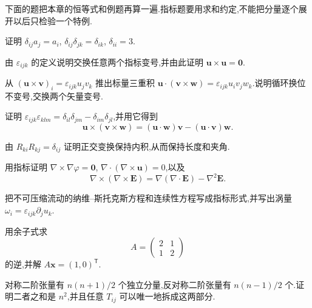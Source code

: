 下面的题把本章的恒等式和例题再算一遍.指标题要用求和约定,不能把分量逐个展开以后只检验一个特例.

\begin{problemset}
\renewcommand{\theenumi}{\thechapter.\arabic{enumi}}
\renewcommand{\labelenumi}{\theenumi.}
\item 证明 $\delta_{ij}a_j=a_i$, $\delta_{ij}\delta_{jk}=\delta_{ik}$, $\delta_{ii}=3$.

\item 由 $\varepsilon_{ijk}$ 的定义说明交换任意两个指标变号,并由此证明 $\mathbf{u}\times\mathbf{u}=\mathbf{0}$.

\item 从 $(\mathbf{u}\times\mathbf{v})_i=\varepsilon_{ijk}u_j v_k$ 推出标量三重积 $\mathbf{u}\cdot(\mathbf{v}\times\mathbf{w})=\varepsilon_{ijk}u_i v_j w_k$.说明循环换位不变号,交换两个矢量变号.

\item 证明 $\varepsilon_{ijk}\varepsilon_{klm}=\delta_{il}\delta_{jm}-\delta_{im}\delta_{jl}$,并用它得到
\begin{equation*}
  \mathbf{u}\times(\mathbf{v}\times\mathbf{w})
  =(\mathbf{u}\cdot\mathbf{w})\mathbf{v}-(\mathbf{u}\cdot\mathbf{v})\mathbf{w}.
\end{equation*}

\item 由 $R_{ki}R_{kj}=\delta_{ij}$ 证明正交变换保持内积,从而保持长度和夹角.

\item 用指标证明 $\nabla\times\nabla\varphi=\mathbf{0}$, $\nabla\cdot(\nabla\times\mathbf{u})=0$,以及
\begin{equation*}
  \nabla\times(\nabla\times\mathbf{E})
  =\nabla(\nabla\cdot\mathbf{E})-\nabla^2\mathbf{E}.
\end{equation*}

\item 把不可压缩流动的纳维--斯托克斯方程和连续性方程写成指标形式,并写出涡量 $\omega_i=\varepsilon_{ijk}\partial_j u_k$.

\item 用余子式求
\begin{equation*}
  A=\begin{pmatrix}2&1\\1&2\end{pmatrix}
\end{equation*}
的逆,并解 $A\mathbf{x}=(1,0)^{\mathsf T}$.

\item 对称二阶张量有 $n(n+1)/2$ 个独立分量,反对称二阶张量有 $n(n-1)/2$ 个.证明二者之和是 $n^2$,并且任意 $T_{ij}$ 可以唯一地拆成这两部分.


\end{problemset}
